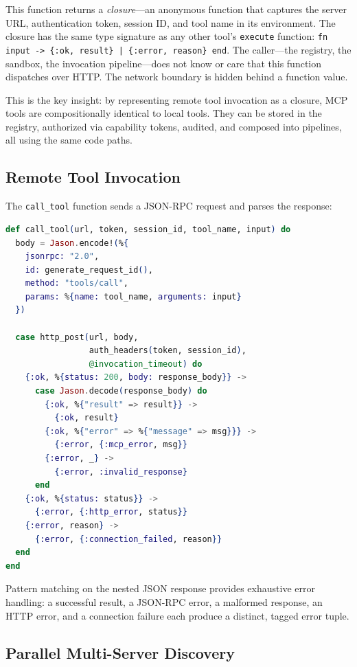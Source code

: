 \documentclass[12pt,a4paper]{article}
\theoremstyle{plain}
\theoremstyle{definition}
\begin{document}
This function returns a \emph{closure}---an anonymous function that captures the server URL, authentication token, session ID, and tool name in its environment. The closure has the same type signature as any other tool's \texttt{execute} function: \texttt{fn input -> \{:ok, result\} | \{:error, reason\} end}. The caller---the registry, the sandbox, the invocation pipeline---does not know or care that this function dispatches over HTTP. The network boundary is hidden behind a function value.

This is the key insight: by representing remote tool invocation as a closure, MCP tools are compositionally identical to local tools. They can be stored in the registry, authorized via capability tokens, audited, and composed into pipelines, all using the same code paths.

\subsection{Remote Tool Invocation}

The \texttt{call\_tool} function sends a JSON-RPC request and parses the response:

\begin{lstlisting}[language=elixir, caption={JSON-RPC tool invocation.}, label={lst:call-tool}]
def call_tool(url, token, session_id, tool_name, input) do
  body = Jason.encode!(%{
    jsonrpc: "2.0",
    id: generate_request_id(),
    method: "tools/call",
    params: %{name: tool_name, arguments: input}
  })

  case http_post(url, body,
                 auth_headers(token, session_id),
                 @invocation_timeout) do
    {:ok, %{status: 200, body: response_body}} ->
      case Jason.decode(response_body) do
        {:ok, %{"result" => result}} ->
          {:ok, result}
        {:ok, %{"error" => %{"message" => msg}}} ->
          {:error, {:mcp_error, msg}}
        {:error, _} ->
          {:error, :invalid_response}
      end
    {:ok, %{status: status}} ->
      {:error, {:http_error, status}}
    {:error, reason} ->
      {:error, {:connection_failed, reason}}
  end
end
\end{lstlisting}

Pattern matching on the nested JSON response provides exhaustive error handling: a successful result, a JSON-RPC error, a malformed response, an HTTP error, and a connection failure each produce a distinct, tagged error tuple.

\subsection{Parallel Multi-Server Discovery}
\end{document}

